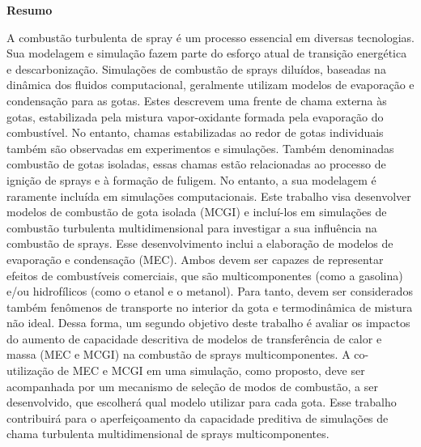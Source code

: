 
\vspace{2cm}

{ \Large \textbf{Resumo}}

\vspace{0.8cm}

{

\noindent %
A combustão turbulenta de spray é um processo essencial em diversas tecnologias. 
Sua modelagem e simulação fazem parte do esforço atual de transição energética e descarbonização.
Simulações de combustão de sprays diluídos, baseadas na dinâmica dos fluidos computacional, geralmente utilizam modelos de evaporação e condensação para as gotas.
Estes descrevem uma frente de chama externa às gotas, estabilizada pela mistura vapor-oxidante formada pela evaporação do combustível.
No entanto, chamas estabilizadas ao redor de gotas individuais também são observadas em experimentos e simulações.
Também denominadas combustão de gotas isoladas, essas chamas estão relacionadas ao processo de ignição de sprays e à formação de fuligem.
No entanto, a sua modelagem é raramente incluída em simulações computacionais.
Este trabalho visa desenvolver modelos de combustão de gota isolada (MCGI) e incluí-los em simulações de combustão turbulenta multidimensional para investigar a sua influência na combustão de sprays.
Esse desenvolvimento inclui a elaboração de modelos de evaporação e condensação (MEC).
Ambos devem ser capazes de representar efeitos de combustíveis comerciais, que são multicomponentes (como a gasolina) e/ou hidrofílicos (como o etanol e o metanol). 
Para tanto, devem ser considerados também fenômenos de transporte no interior da gota e termodinâmica de mistura não ideal.
Dessa forma, um segundo objetivo deste trabalho é avaliar os impactos do aumento de capacidade descritiva de modelos de transferência de calor e massa (MEC e MCGI) na combustão de sprays multicomponentes.
A co-utilização de MEC e MCGI em uma simulação, como proposto, deve ser acompanhada por um mecanismo de seleção de modos de combustão, a ser desenvolvido, que escolherá qual modelo utilizar para cada gota.
Esse trabalho contribuirá para o aperfeiçoamento da capacidade preditiva de simulações de chama turbulenta multidimensional de sprays multicomponentes.

}
